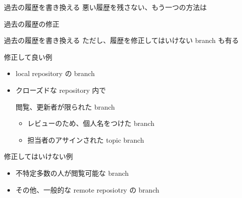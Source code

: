 \begin{frame}[t]{過去の履歴を書き換える}{}
  悪い履歴を残さない、もう一つの方法は

  過去の履歴の修正
  \vspace{4ex}

  \vspace{4ex}

\end{frame}


\begin{frame}[t]{過去の履歴を書き換える}{}
  ただし、履歴を修正してはいけない branch も有る
  \vspace{2ex}

  修正して良い例
  \begin{itemize}
  \item local repository の branch
  \item クローズドな repository 内で

    閲覧、更新者が限られた branch
    \begin{itemize}
    \item レビューのため、個人名をつけた branch
    \item 担当者のアサインされた topic branch
    \end{itemize}
  \end{itemize}
  \vspace{2ex}

  修正してはいけない例
  \begin{itemize}
  \item 不特定多数の人が閲覧可能な branch
  \item その他、一般的な remote reposiotry の branch
  \end{itemize}
\end{frame}


